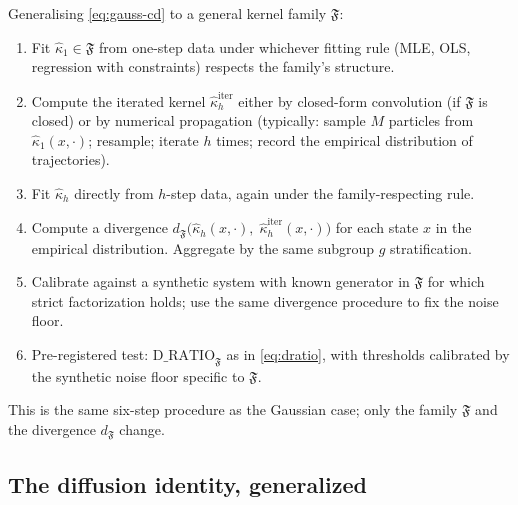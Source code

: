 \documentclass[11pt]{article}
\theoremstyle{definition}
\theoremstyle{plain}
\begin{document}
Generalising \eqref{eq:gauss-cd} to a general kernel family
$\mathfrak{F}$:

\begin{enumerate}[leftmargin=2em]
\item Fit $\hat\kappa_1 \in \mathfrak{F}$ from one-step data
under whichever fitting rule (MLE, OLS, regression with constraints)
respects the family's structure.

\item Compute the iterated kernel $\hat\kappa_h^{\mathrm{iter}}$
either by closed-form convolution (if $\mathfrak{F}$ is closed) or
by numerical propagation (typically: sample $M$ particles from
$\hat\kappa_1(x, \cdot)$; resample; iterate $h$ times; record the
empirical distribution of trajectories).

\item Fit $\hat\kappa_h$ directly from $h$-step data, again under
the family-respecting rule.

\item Compute a divergence
$d_{\mathfrak{F}}\!\bigl(\hat\kappa_h(x, \cdot),\;
\hat\kappa_h^{\mathrm{iter}}(x, \cdot)\bigr)$ for each state $x$
in the empirical distribution. Aggregate by the same subgroup
$g$ stratification.

\item Calibrate against a synthetic system with known generator
in $\mathfrak{F}$ for which strict factorization holds; use the
same divergence procedure to fix the noise floor.

\item Pre-registered test: $\mathrm{D\_RATIO}_{\mathfrak{F}}$ as
in \eqref{eq:dratio}, with thresholds calibrated by the synthetic
noise floor specific to $\mathfrak{F}$.
\end{enumerate}

This is the same six-step procedure as the Gaussian case; only
the family $\mathfrak{F}$ and the divergence $d_{\mathfrak{F}}$
change.

\subsection{The diffusion identity, generalized}
\label{sec:gen-diffusion}
\end{document}
